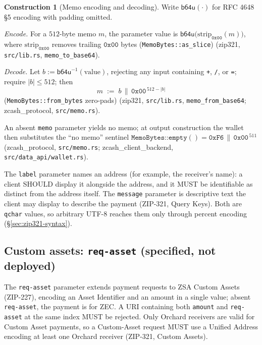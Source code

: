 \documentclass[11pt,a4paper]{article}
\theoremstyle{definition}
\newtheorem{construction}[theorem]{Construction}
\begin{document}
\begin{construction}[Memo encoding and decoding]\label{def:zip321-memoenc}
Write $\mathsf{b64u}(\cdot)$ for RFC 4648 \S5 encoding with padding omitted.

\emph{Encode.} For a $512$-byte memo $m$, the parameter value is
$\mathsf{b64u}\bigl(\mathrm{strip}_{\mathtt{0x00}}(m)\bigr)$, where
$\mathrm{strip}_{\mathtt{0x00}}$ removes trailing $\mathtt{0x00}$ bytes
(\texttt{MemoBytes::as\_slice}) (\textsf{zip321}, \texttt{src/lib.rs},
\texttt{memo\_to\_base64}).

\emph{Decode.} Let $b := \mathsf{b64u}^{-1}(\text{value})$, rejecting any
input containing \texttt{+}, \texttt{/}, or \texttt{=}; require
$|b| \le 512$; then
\[
m \;:=\; b \,\|\, \mathtt{0x00}^{\,512-|b|}
\]
(\texttt{MemoBytes::from\_bytes} zero-pads) (\textsf{zip321},
\texttt{src/lib.rs}, \texttt{memo\_from\_base64};
\textsf{zcash\_protocol}, \texttt{src/memo.rs}).

An absent \texttt{memo} parameter yields no memo; at output construction the
wallet then substitutes the ``no memo'' sentinel
$\texttt{MemoBytes::empty}() = \mathtt{0xF6} \,\|\, \mathtt{0x00}^{\,511}$
(\textsf{zcash\_protocol}, \texttt{src/memo.rs};
\textsf{zcash\_client\_backend}, \texttt{src/data\_api/wallet.rs}).
\end{construction}

The \texttt{label} parameter names an address (for example, the receiver's
name): a client SHOULD display it alongside the address, and it MUST be
identifiable as distinct from the address itself. The \texttt{message}
parameter is descriptive text the client may display to describe the payment
(ZIP-321, Query Keys). Both are \texttt{qchar} values, so arbitrary UTF-8
reaches them only through percent encoding
(\S\ref{sec:zip321-syntax}).

\subsection{Custom assets: \texttt{req-asset} (specified, not deployed)}
\label{sec:zip321-asset}

The \texttt{req-asset} parameter extends payment requests to ZSA Custom
Assets (ZIP-227), encoding an Asset Identifier and an amount in a single
value; absent \texttt{req-asset}, the payment is for ZEC. A URI containing
both \texttt{amount} and \texttt{req-asset} at the same index MUST be
rejected. Only Orchard receivers are valid for Custom Asset payments, so a
Custom-Asset request MUST use a Unified Address encoding at least one
Orchard receiver (ZIP-321, Custom Assets).
\end{document}
